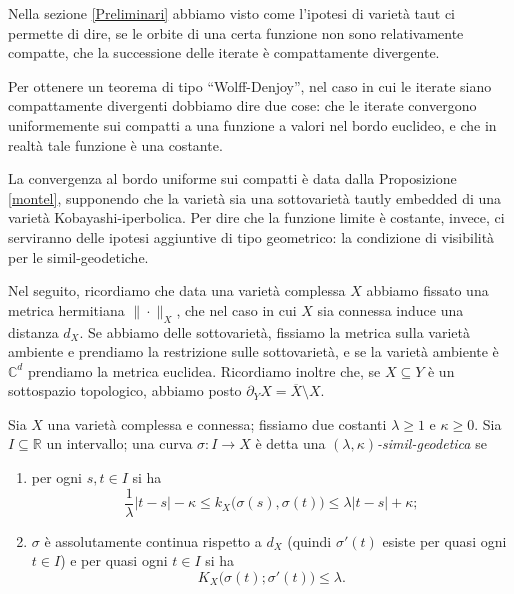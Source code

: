 Nella sezione \ref{Preliminari} abbiamo visto come l'ipotesi di varietà taut ci permette di dire, se le orbite di una certa funzione non sono relativamente compatte, che la successione delle iterate è compattamente divergente.

Per ottenere un teorema di tipo ``Wolff-Denjoy'', nel caso in cui le iterate siano compattamente divergenti dobbiamo dire due cose: che le iterate convergono uniformemente sui compatti a una funzione a valori nel bordo euclideo, e che in realtà tale funzione è una costante.

La convergenza al bordo uniforme sui compatti è data dalla Proposizione \ref{montel}, supponendo che la varietà sia una sottovarietà tautly embedded di una varietà Kobayashi-iperbolica. Per dire che la funzione limite è costante, invece, ci serviranno delle ipotesi aggiuntive di tipo geometrico: la condizione di visibilità per le simil-geodetiche.

Nel seguito, ricordiamo che data una varietà complessa $X$ abbiamo fissato una metrica hermitiana $\|\cdot\|_X$, che nel caso in cui $X$ sia connessa induce una distanza $d_X$. Se abbiamo delle sottovarietà, fissiamo la metrica sulla varietà ambiente e prendiamo la restrizione sulle sottovarietà, e se la varietà ambiente è $\mathbb{C}^d$ prendiamo la metrica euclidea. Ricordiamo inoltre che, se $X\subseteq Y$ è un sottospazio topologico, abbiamo posto $\partial_YX=\overline{X}\setminus X$.

\begin{defn}
    Sia $X$ una varietà complessa e connessa; fissiamo due costanti $\lambda \ge 1$ e $\kappa \ge 0$. Sia $I\subseteq \mathbb{R}$ un intervallo; una curva $\sigma:I \longrightarrow X$ è detta una \textit{$(\lambda,\kappa)$-simil-geodetica} se
    \begin{enumerate}
        \item per ogni $s,t \in I$ si ha
        \begin{equation} \label{simil-geo1}
            \frac{1}{\lambda}|t-s|-\kappa \le k_X\big(\sigma(s),\sigma(t)\big)\le\lambda|t-s|+\kappa;
        \end{equation}
        \item $\sigma$ è assolutamente continua rispetto a $d_X$ (quindi $\sigma'(t)$ esiste per quasi ogni $t \in I$) e per quasi ogni $t \in I$ si ha
        \begin{equation} \label{simil-geo2}
            K_X\big(\sigma(t);\sigma'(t)\big) \le \lambda.
        \end{equation}
    \end{enumerate}
\end{defn}

